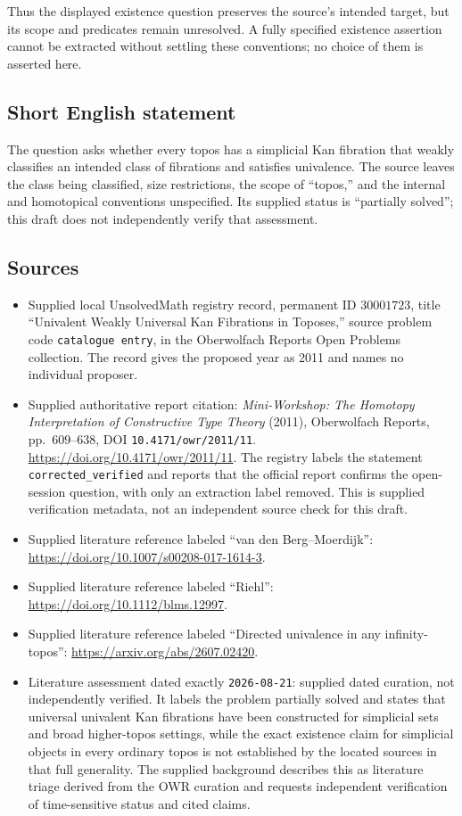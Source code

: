 \documentclass[11pt]{article}
\begin{document}
Thus the displayed existence question preserves the source's intended target, but its scope and predicates remain unresolved. A fully specified existence assertion cannot be extracted without settling these conventions; no choice of them is asserted here.
\subsection{Short English statement}
The question asks whether every topos has a simplicial Kan fibration that weakly classifies an intended class of fibrations and satisfies univalence. The source leaves the class being classified, size restrictions, the scope of ``topos,'' and the internal and homotopical conventions unspecified. Its supplied status is ``partially solved''; this draft does not independently verify that assessment.
\subsection{Sources}
\begin{itemize}
\item Supplied local UnsolvedMath registry record, permanent ID \(30001723\), title ``Univalent Weakly Universal Kan Fibrations in Toposes,'' source problem code \texttt{catalogue entry}, in the Oberwolfach Reports Open Problems collection. The record gives the proposed year as 2011 and names no individual proposer.
\item Supplied authoritative report citation: \emph{Mini-Workshop: The Homotopy Interpretation of Constructive Type Theory} (2011), Oberwolfach Reports, pp.~609--638, DOI \texttt{10.4171/owr/2011/11}. \url{https://doi.org/10.4171/owr/2011/11}. The registry labels the statement \texttt{corrected\_verified} and reports that the official report confirms the open-session question, with only an extraction label removed. This is supplied verification metadata, not an independent source check for this draft.
\item Supplied literature reference labeled ``van den Berg--Moerdijk'': \url{https://doi.org/10.1007/s00208-017-1614-3}.
\item Supplied literature reference labeled ``Riehl'': \url{https://doi.org/10.1112/blms.12997}.
\item Supplied literature reference labeled ``Directed univalence in any infinity-topos'': \url{https://arxiv.org/abs/2607.02420}.
\item Literature assessment dated exactly \texttt{2026-08-21}: supplied dated curation, not independently verified. It labels the problem partially solved and states that universal univalent Kan fibrations have been constructed for simplicial sets and broad higher-topos settings, while the exact existence claim for simplicial objects in every ordinary topos is not established by the located sources in that full generality. The supplied background describes this as literature triage derived from the OWR curation and requests independent verification of time-sensitive status and cited claims.
\end{itemize}
\end{document}
